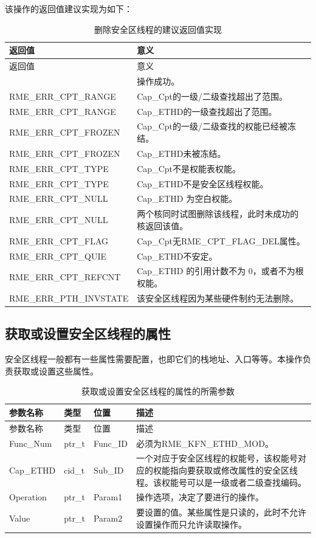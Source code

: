该操作的返回值建议实现为如下：

\begin{xltabular}{\textwidth}{@{}>{\hsize\raggedright\arraybackslash}X>{\hsize\raggedright\arraybackslash}X@{}}
\caption{删除安全区线程的建议返回值实现}\label{tab:8-103-delete-enclave-thread-suggested-return-values}\\
\toprule
返回值 & 意义\tabularnewline
\endfirsthead
\toprule
返回值 & 意义\tabularnewline
\midrule
\endhead
\bottomrule
{} & 操作成功。\tabularnewline
    RME\_ERR\_CPT\_RANGE & Cap\_Cpt的一级/二级查找超出了范围。\tabularnewline
    RME\_ERR\_CPT\_RANGE & Cap\_ETHD的一级查找超出了范围。\tabularnewline
    RME\_ERR\_CPT\_FROZEN & Cap\_Cpt的一级/二级查找的权能已经被冻结。\tabularnewline
    RME\_ERR\_CPT\_FROZEN & Cap\_ETHD未被冻结。\tabularnewline
    RME\_ERR\_CPT\_TYPE & Cap\_Cpt不是权能表权能。\tabularnewline
    RME\_ERR\_CPT\_TYPE & Cap\_ETHD不是安全区线程权能。\tabularnewline
    RME\_ERR\_CPT\_NULL & Cap\_ETHD 为空白权能。\tabularnewline
    RME\_ERR\_CPT\_NULL & 两个核同时试图删除该线程，此时未成功的核返回该值。\tabularnewline
    RME\_ERR\_CPT\_FLAG & Cap\_Cpt无RME\_CPT\_FLAG\_DEL属性。\tabularnewline
    RME\_ERR\_CPT\_QUIE & Cap\_ETHD不安定。\tabularnewline
    RME\_ERR\_CPT\_REFCNT & Cap\_ETHD 的引用计数不为 0，或者不为根权能。\tabularnewline
    RME\_ERR\_PTH\_INVSTATE & 该安全区线程因为某些硬件制约无法删除。\tabularnewline
\end{xltabular}

\subsection{获取或设置安全区线程的属性}\label{subsec:8-get-or-set-enclave-thread-attributes}

安全区线程一般都有一些属性需要配置，也即它们的栈地址、入口等等。本操作负责获取或设置这些属性。

\begin{xltabular}{\textwidth}{@{}>{\hsize\raggedright\arraybackslash}X>{\hsize\raggedright\arraybackslash}X>{\hsize\raggedright\arraybackslash}X>{\hsize\raggedright\arraybackslash}X@{}}
\caption{获取或设置安全区线程的属性的所需参数}\label{tab:8-104-get-or-set-enclave-thread-attributes-parameters}\\
\toprule
参数名称 & 类型 & 位置 & 描述\tabularnewline
\endfirsthead
\toprule
参数名称 & 类型 & 位置 & 描述\tabularnewline
\midrule
\endhead
\bottomrule
\endlastfoot
Func\_Num & ptr\_t & Func\_ID &
必须为RME\_KFN\_ETHD\_MOD。\tabularnewline
Cap\_ETHD & cid\_t & Sub\_ID &
一个对应于安全区线程的权能号，该权能号对应的权能指向要获取或修改属性的安全区线程。该权能号可以是一级或者二级查找编码。\tabularnewline
Operation & ptr\_t & Param1 &
操作选项，决定了要进行的操作。\tabularnewline
Value & ptr\_t & Param2 &
要设置的值。某些属性是只读的，此时不允许设置操作而只允许读取操作。\tabularnewline
\end{xltabular}

